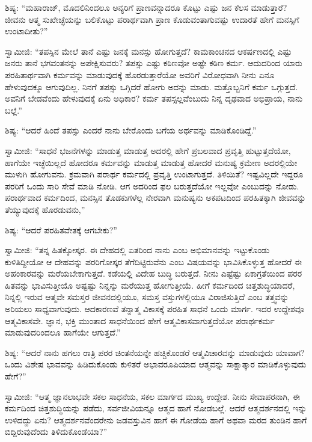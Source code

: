  ಶಿಷ್ಯ: “ಮಹಾರಾಜ್, ಮೊದಲಿನಿಂದಲೂ ಅನ್ಯರಿಗೆ ಪ್ರಾಣವನ್ನಾದರೂ ಕೊಟ್ಟು ಎಷ್ಟು ಜನ ಕೆಲಸ ಮಾಡುತ್ತಾರೆ? ಜೀವನು ಆತ್ಮ ಸುಖೇಚ್ಛೆಯನ್ನು ಬಲಿಕೊಟ್ಟು ಪರಾರ್ಥವಾಗಿ ಪ್ರಾಣ ಕೊಡುವಂತಾಗುವಷ್ಟು ಉದಾರತೆ ಹೇಗೆ ಮನಸ್ಸಿಗೆ ಉಂಟಾದೀತು?” 

 ಸ್ವಾಮೀಜಿ: “ತಪಸ್ಸಿನ ಮೇಲೆ ತಾನೆ ಎಷ್ಟು ಜನಕ್ಕೆ ಮನಸ್ಸು ಹೋಗುತ್ತದೆ? ಕಾಮಕಾಂಚನದ ಆಕರ್ಷಣದಲ್ಲಿ ಎಷ್ಟು ಜನರು ತಾನೆ ಭಗವಂತನನ್ನು ಅಪೇಕ್ಷಿಸುವರು? ತಪಸ್ಸು ಎಷ್ಟು ಕಠಿಣವೋ ಅಷ್ಟೇ ಕಠಿಣ ಕರ್ಮ. ಆದುದರಿಂದ ಯಾರು ಪರ\break ಹಿತಾರ್ಥವಾಗಿ ಕರ್ಮವನ್ನು ಮಾಡುವುದಕ್ಕೆ ಹೊರಡುತ್ತಾರೆಯೋ ಅವರಿಗೆ ವಿರೋಧವಾಗಿ ನೀನು ಏನೂ ಹೇಳುವುದಕ್ಕೂ ಆಗುವುದಿಲ್ಲ. ನಿನಗೆ ತಪಸ್ಸು ಒಗ್ಗಿದರೆ ಹೋಗು ಅದನ್ನು ಮಾಡು. ಮತ್ತೊಬ್ಬನಿಗೆ ಕರ್ಮ ಒಗ್ಗುತ್ತದೆ. ಅವನಿಗೆ ಬೇಡವೆಂದು ಹೇಳುವುದಕ್ಕೆ ಏನು ಅಧಿಕಾರ? ಕರ್ಮ ತಪಸ್ಸಲ್ಲವೆಂಬುದು ನಿನ್ನ ದೃಢವಾದ ಅಭಿಪ್ರಾಯ, ನಾನು ಬಲ್ಲೆ.” 

 ಶಿಷ್ಯ: “ಆದರೆ ಹಿಂದೆ ತಪಸ್ಸು ಎಂದರೆ ನಾನು ಬೇರೊಂದು ಬಗೆಯ ಅರ್ಥವನ್ನು ಮಾಡಿಕೊಂಡಿದ್ದೆ.” 

 ಸ್ವಾಮೀಜಿ: “ಸಾಧನೆ ಭಜನೆಗಳನ್ನು ಮಾಡುತ್ತ ಮಾಡುತ್ತ ಅದರಲ್ಲಿ ಹೇಗೆ ಪ್ರಬಲವಾದ ಪ್ರವೃತ್ತಿ ಹುಟ್ಟುತ್ತದೆಯೋ, ಹಾಗೆಯೇ ಇಚ್ಛೆಯಿಲ್ಲದೆ ಹೋದರೂ ಕರ್ಮವನ್ನು ಮಾಡುತ್ತ ಮಾಡುತ್ತ ಹೋದರೆ ಮನುಷ್ಯ ಕ್ರಮೇಣ ಅದರಲ್ಲಿಯೇ ಮುಳುಗಿ ಹೋಗುವನು. ಕ್ರಮವಾಗಿ ಪರಾರ್ಥ ಕರ್ಮದಲ್ಲಿ ಪ್ರವೃತ್ತಿ ಉಂಟಾಗುತ್ತದೆ. ತಿಳಿಯಿತೆ? ಇಷ್ಟವಿಲ್ಲದೇ ಇದ್ದರೂ ಪರರಿಗೆ ಒಂದು ಸಾರಿ ಸೇವೆ ಮಾಡಿ ನೋಡಿ. ಆಗ ಅದರಿಂದ ಫಲ ಬರುತ್ತದೆಯೋ ಇಲ್ಲವೋ ಎಂಬುದನ್ನು ನೋಡು. ಪರಾರ್ಥವಾದ ಕರ್ಮದಿಂದ, ಮನಸ್ಸಿನ ತೊಡಕುಗಳೆಲ್ಲ ನೇರವಾಗಿ ಮನುಷ್ಯನು ಅಕಪಟದಿಂದ ಪರಹಿತಕ್ಕಾಗಿ ಜೀವವನ್ನು ತೆಯ್ಯುವುದಕ್ಕೆ ಹೊರಡುವನು,” 

 ಶಿಷ್ಯ: “ಆದರೆ ಪರಹಿತವೇತಕ್ಕೆ ಆಗಬೇಕು?” 

 ಸ್ವಾಮೀಜಿ: “ತನ್ನ ಹಿತಕ್ಕೋಸ್ಕರ. ಈ ದೇಹದಲ್ಲಿ ಏತರಿಂದ ನಾನು ಎಂಬ ಅಭಿಮಾನವನ್ನು ಇಟ್ಟುಕೊಂಡು ಕುಳಿತಿದ್ದೀಯೋ ಆ ದೇಹವನ್ನು ಪರರಿಗೋಸ್ಕರ ತೆಗೆದಿಟ್ಟಿರುವೆನು ಎಂಬ ವಿಷಯವನ್ನು ಭಾವಿಸಿಕೊಳ್ಳುತ್ತ ಹೋದರೆ ಈ ಅಹಂಕಾರವನ್ನು ಮರೆಯಬೇಕಾಗುತ್ತದೆ. ಕಡೆಯಲ್ಲಿ ವಿದೇಹ ಬುದ್ಧಿ ಬರುತ್ತದೆ. ನೀನು ಎಷ್ಟೆಷ್ಟು ಏಕಾಗ್ರತೆಯಿಂದ ಪರರ ಹಿತವನ್ನು ಭಾವಿಸುತ್ತೀಯೊ ಅಷ್ಟಷ್ಟು ನಿನ್ನನ್ನು ಮರೆಯುತ್ತ ಹೋಗುತ್ತೀಯೆ. ಹೀಗೆ ಕರ್ಮದಿಂದ ಚಿತ್ತಶುದ್ಧಿಯಾದರೆ, ನಿನ್ನಲ್ಲಿ ಇರುವ ಆತ್ಮವೇ ಸಮಸ್ತರ ಜೀವನದಲ್ಲಿಯೂ, ಸಮಸ್ತ ವಸ್ತುಗಳಲ್ಲಿಯೂ ವಿರಾಜಿಸುತ್ತಿದೆ ಎಂಬ ತತ್ತ್ವವನ್ನು ಅರಿಯಲು ಸಾಧ್ಯವಾಗುವುದು. ಆದಕಾರಣವೆ ತನ್ನಾತ್ಮ ವಿಕಾಸಕ್ಕೆ ಪರಹಿತ ಸಾಧನೆ ಒಂದು ಮಾರ್ಗ. ಇದರ ಉದ್ದೇಶವೂ ಆತ್ಮವಿಕಾಸವೇ. ಜ್ಞಾನ, ಭಕ್ತಿ ಮುಂತಾದ ಸಾಧನೆಯಿಂದ ಹೇಗೆ ಆತ್ಮವಿಕಾಸವಾಗುತ್ತದೆಯೋ ಪರಾರ್ಥಕರ್ಮ ಮಾಡುವುದರಿಂದಲೂ ಹಾಗೆಯೇ ಆಗುತ್ತದೆ.” 

 ಶಿಷ್ಯ: “ಆದರೆ ನಾನು ಹಗಲು ರಾತ್ರಿ ಪರರ ಚಿಂತನೆಯನ್ನೇ ಹಚ್ಚಿಕೊಂಡರೆ ಆತ್ಮವಿಚಾರವನ್ನು ಮಾಡುವುದು ಯಾವಾಗ? ಒಂದು ವಿಶೇಷ ಭಾವವನ್ನು ಹಿಡಿದುಕೊಂಡು ಕುಳಿತರೆ ಅಭಾವರೂಪಿಯಾದ ಆತ್ಮವನ್ನು ಸಾಕ್ಷಾತ್ಕಾರ ಮಾಡಿಕೊಳ್ಳುವುದು ಹೇಗೆ?” 

 ಸ್ವಾಮೀಜಿ: “ಆತ್ಮ ಜ್ಞಾನಲಾಭವೇ ಸಕಲ ಸಾಧನೆಯ, ಸಕಲ ಮಾರ್ಗದ ಮುಖ್ಯ ಉದ್ದೇಶ. ನೀನು ಸೇವಾಪರನಾಗಿ, ಈ ಕರ್ಮದಿಂದ ಚಿತ್ತಶುದ್ಧಿಯನ್ನು ಪಡೆದು, ಸರ್ವಜೀವಿಯನ್ನೂ ಆತ್ಮದ ಹಾಗೆ ನೋಡಬಲ್ಲೆ. ಆದರೆ ಆತ್ಮದರ್ಶನದಲ್ಲಿ ಇನ್ನು ಉಳಿದದ್ದು ಏನು? ಆತ್ಮದರ್ಶನವೆಂದರೇನು ಜಡವಸ್ತುವಿನ ಹಾಗೆ ಈ ಗೋಡೆಯ ಹಾಗೆ ಅಥವಾ ಮರದ ತುಂಡಿನ ಹಾಗೆ ಬಿದ್ದಿರುವುದೆಂದು ತಿಳಿದುಕೊಂಡೆಯಾ?” 

